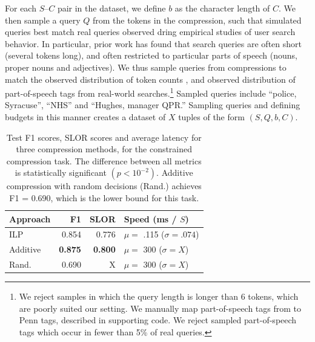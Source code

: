 \documentclass[11pt,a4paper]{article}
\begin{document}
For each $S$--$C$ pair in the dataset, we define $b$ as the character length of $C$. We then sample a query $Q$ from the tokens in the compression, such that simulated queries best match real queries observed dring empirical studies of user search behavior. In particular, prior work has found that search queries are often short (several tokens long), and often restricted to particular parts of speech (nouns, proper nouns and adjectives). We thus sample queries from compressions to match the observed distribution of token counts \cite{Jansen2000RealLR}, and observed distribution of part-of-speech tags \cite{Barr2008TheLS} from real-world searches.\footnote{We reject samples in which the query length is longer than 6 tokens, which are poorly suited our setting. We manually map part-of-speech tags from \citet{Barr2008TheLS} to Penn tags, described in supporting code. We reject sampled part-of-speech tags which occur in fewer than 5\% of real queries.} Sampled queries include ``police, Syracuse'', ``NHS'' and ``Hughes, manager QPR.'' Sampling queries and defining budgets in this manner creates a dataset of $X$ tuples of the form $(S,Q,b,C)$.

\begin{table}[]
\begin{tabular}{lrrl}
\centering
Approach & F1 & SLOR &  Speed {\small (ms / $S$)}  \\ \hline
ILP &  {\small 0.854}   &  {\small 0.776 }  & {\small $\mu=$ .115} ({\small $ \sigma=.074$}) \\
Additive &  {\small \textbf{0.875}}  & {\small \textbf{0.800} }& {\small $\mu=$ 300} ({\small $ \sigma=X$}) \\
Rand.  &  {\small 0.690}  & { X }& {\small $\mu=$ 300} ({\small $ \sigma=X$}) \\
\end{tabular}
\caption{Test F1 scores, SLOR scores and average latency for three compression methods, for the constrained compression task. The difference between all metrics is statistically significant {\small $(p < 10^{-2})$}. Additive compression with random decisions (Rand.) achieves F1 = 0.690, which is the lower bound for this task.}
\label{t:results}
\end{table}

\end{document}

